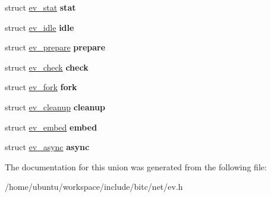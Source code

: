 \begin{DoxyCompactItemize}
\item 
\hypertarget{unionev__any__watcher_a4daa1c06972b03f1e574012ff85f7849}{struct \hyperlink{structev__stat}{ev\-\_\-stat} {\bfseries stat}}\label{unionev__any__watcher_a4daa1c06972b03f1e574012ff85f7849}

\item 
\hypertarget{unionev__any__watcher_a981b4fb4bb0c57edde815eb5c653ab21}{struct \hyperlink{structev__idle}{ev\-\_\-idle} {\bfseries idle}}\label{unionev__any__watcher_a981b4fb4bb0c57edde815eb5c653ab21}

\item 
\hypertarget{unionev__any__watcher_ab8e9044b76b083a745fe88887035c5b7}{struct \hyperlink{structev__prepare}{ev\-\_\-prepare} {\bfseries prepare}}\label{unionev__any__watcher_ab8e9044b76b083a745fe88887035c5b7}

\item 
\hypertarget{unionev__any__watcher_a11934d4f1f244f75b706db27abfea16e}{struct \hyperlink{structev__check}{ev\-\_\-check} {\bfseries check}}\label{unionev__any__watcher_a11934d4f1f244f75b706db27abfea16e}

\item 
\hypertarget{unionev__any__watcher_a63e589011bdf5d405a87b0b452d0aa18}{struct \hyperlink{structev__fork}{ev\-\_\-fork} {\bfseries fork}}\label{unionev__any__watcher_a63e589011bdf5d405a87b0b452d0aa18}

\item 
\hypertarget{unionev__any__watcher_acf48afbff0708cefa05cfdb2a3f89c52}{struct \hyperlink{structev__cleanup}{ev\-\_\-cleanup} {\bfseries cleanup}}\label{unionev__any__watcher_acf48afbff0708cefa05cfdb2a3f89c52}

\item 
\hypertarget{unionev__any__watcher_adecc46ee7ea240767431d1247109ae87}{struct \hyperlink{structev__embed}{ev\-\_\-embed} {\bfseries embed}}\label{unionev__any__watcher_adecc46ee7ea240767431d1247109ae87}

\item 
\hypertarget{unionev__any__watcher_ad0452986b798bbf59f852b3e4d164cfe}{struct \hyperlink{structev__async}{ev\-\_\-async} {\bfseries async}}\label{unionev__any__watcher_ad0452986b798bbf59f852b3e4d164cfe}

\end{DoxyCompactItemize}


The documentation for this union was generated from the following file\-:\begin{DoxyCompactItemize}
\item 
/home/ubuntu/workspace/include/bitc/net/ev.\-h\end{DoxyCompactItemize}
